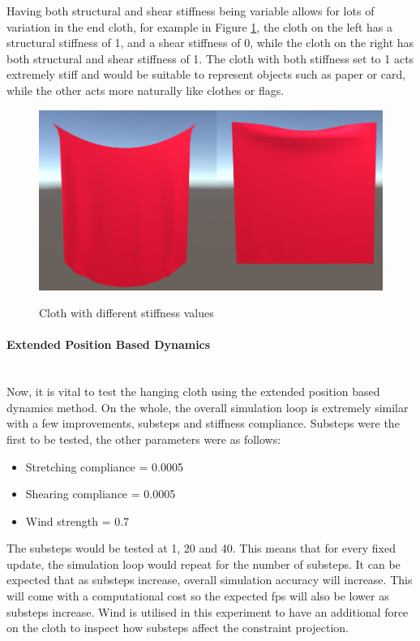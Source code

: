 \documentclass[12pt,a4paper]{article}
\begin{document}
Having both structural and shear stiffness being variable allows for lots of variation in the end cloth, for example in Figure \ref{fig:pbdcomp}, the cloth on the left has a structural stiffness of 1, and a shear stiffness of 0, while the cloth on the right has both structural and shear stiffness of 1. The cloth with both stiffness set to 1 acts extremely stiff and would be suitable to represent objects such as paper or card, while the other acts more naturally like clothes or flags.
\begin{figure}
	\centering
	\caption{Cloth with different stiffness values}
	\includegraphics[scale=0.5]{pbdcomp.png}
	\label{fig:pbdcomp}
\end{figure}
\paragraph{Extended Position Based Dynamics} \mbox{} \\
Now, it is vital to test the hanging cloth using the extended position based dynamics method. On the whole, the overall simulation loop is extremely similar with a few improvements, substeps and stiffness compliance. Substeps were the first to be tested, the other parameters were as follows:  
\begin{itemize}
	\item Stretching compliance = 0.0005
	\item Shearing compliance = 0.0005
	\item Wind strength = 0.7
\end{itemize}
The substeps would be tested at 1, 20 and 40. This means that for every fixed update, the simulation loop would repeat for the number of substeps. It can be expected that as substeps increase, overall simulation accuracy will increase. This will come with a computational cost so the expected fps will also be lower as substeps increase. Wind is utilised in this experiment to have an additional force on the cloth to inspect how substeps affect the constraint projection. \\
\end{document}
